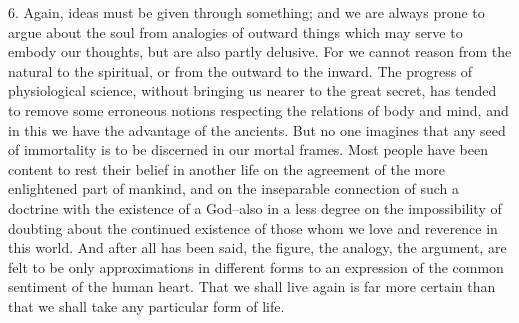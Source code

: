 6. Again, ideas must be given through something; and we are always prone
to argue about the soul from analogies of outward things which may serve
to embody our thoughts, but are also partly delusive. For we cannot
reason from the natural to the spiritual, or from the outward to the
inward. The progress of physiological science, without bringing us
nearer to the great secret, has tended to remove some erroneous notions
respecting the relations of body and mind, and in this we have the
advantage of the ancients. But no one imagines that any seed of
immortality is to be discerned in our mortal frames. Most people have
been content to rest their belief in another life on the agreement of
the more enlightened part of mankind, and on the inseparable connection
of such a doctrine with the existence of a God--also in a less degree
on the impossibility of doubting about the continued existence of those
whom we love and reverence in this world. And after all has been
said, the figure, the analogy, the argument, are felt to be only
approximations in different forms to an expression of the common
sentiment of the human heart. That we shall live again is far more
certain than that we shall take any particular form of life.

